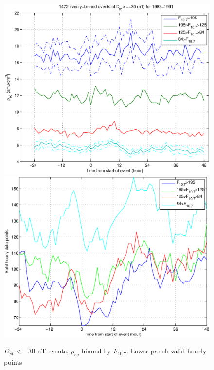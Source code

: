 \documentclass[10pt,twocolumn]{article}
\begin{document}
\hfill
\begin{figure}[htp!]
\includegraphics[scale=0.45]{paperfigures/HighLowF107rhoeq-Dst30.eps}
\includegraphics[scale=0.45]{paperfigures/HighLowF107rhoeq-Dst30-valid.eps}
\caption{$D_{st} < -30$ nT events, $\rho_{eq}$ binned by $F_{10.7}$. Lower panel: valid hourly points}
\end{figure}
\hfill
\end{document}
